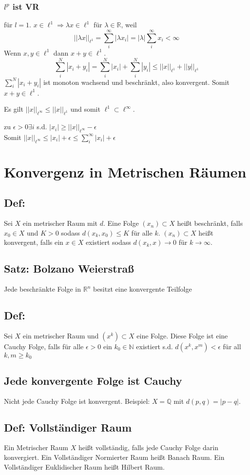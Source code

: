 \subsubsection{$l^p$ ist VR}
für $l=1$. $x\in \ell^1\Rightarrow \lambda x\in\ell^1$ für $\lambda\in\mathbb R$, weil
$$
||\lambda x||_{\ell^1} = \sum_i^\infty |\lambda x_i| = |\lambda|\sum_i^\infty x_i < \infty
$$
Wenn $x,y\in\ell^1$ dann $x+y\in\ell^1$.
$$
\sum_i^N |x_i + y_i| = \sum_i^N |x_i| + \sum_i^N |y_i| \leq ||x||_{\ell^1} + ||y||_{\ell^1}
$$
$\sum_i^N |x_i+y_i|$ ist monoton wachsend und beschränkt, also konvergent. Somit $x+y\in \ell^1$.

Es gilt $||x||_{\ell^\infty} \leq ||x||_{\ell^1}$ und somit $\ell^1 \subset \ell^\infty$.

zu $\epsilon>0\exists i$ s.d. $|x_i| \geq ||x||_{\ell^\infty} - \epsilon$\\
Somit $||x||_{\ell^\infty} \leq |x_i| + \epsilon \leq \sum_i^\infty |x_i| + \epsilon$

\section{Konvergenz in Metrischen Räumen}

\subsection{Def: }
Sei $X$ ein metrischer Raum mit $d$. Eine Folge $(x_n)\subset X$ heißt beschränkt, falls $x_0\in X$ und $K>0$ sodass $d(x_k, x_0)\leq K$ für alle $k$. $(x_n)\subset X$ heißt konvergent, falls ein $x\in X$ existiert sodass $d(x_k, x) \rightarrow 0$ für $k\rightarrow \infty$.


\subsection{Satz: Bolzano Weierstraß}
Jede beschränkte Folge in $\mathbb R^n$ besitzt eine konvergente Teilfolge

\subsection{Def: }
Sei $X$ ein metrischer Raum und $(x^k)\subset X$ eine Folge. Diese Folge ist eine Cauchy Folge, falls für alle $\epsilon>0$ ein $k_0\in\mathbb N$ existiert s.d. $d(x^k, x^m)<\epsilon$ für all $k,m \geq k_0$ 

\subsection{Jede konvergente Folge ist Cauchy}
Nicht jede Cauchy Folge ist konvergent. Beispiel: $X=\mathbb Q$ mit $d(p,q) = |p-q|$. 

\subsection{Def: Vollständiger Raum}
Ein Metrischer Raum $X$ heißt vollständig, falls jede Cauchy Folge darin konvergiert. Ein Vollständiger Normierter Raum heißt Banach Raum. Ein Vollständiger Euklidischer Raum heißt Hilbert Raum.



